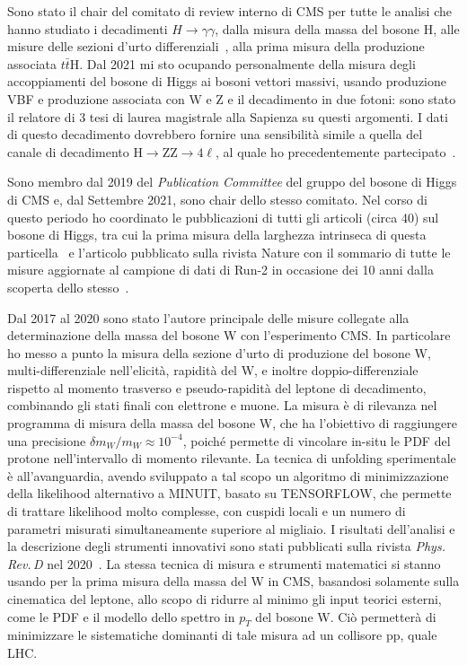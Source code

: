 \documentclass[a4paper,12pt,twoside]{article}
\begin{document}
{  Sono stato il chair del comitato di review interno di CMS per tutte
  le analisi che hanno studiato i decadimenti $H\to\gamma\gamma$,
  dalla misura della massa del bosone H, alle misure delle sezioni
  d'urto differenziali~, alla prima misura
  della produzione associata $t\bar{t}$H.  Dal 2021 mi sto ocupando
  personalmente della misura degli accoppiamenti del bosone di Higgs
  ai bosoni vettori massivi, usando produzione VBF e produzione
  associata con W e Z e il decadimento in due fotoni: sono stato il
  relatore di 3 tesi di laurea magistrale alla Sapienza su questi
  argomenti. I dati di questo decadimento dovrebbero fornire una
  sensibilit\`a simile a quella del canale di decadimento H$\to$ZZ$\to
  4\ell$, al quale ho precedentemente
  partecipato~.
  
  Sono membro dal 2019 del {\it Publication Committee} del gruppo del
  bosone di Higgs di CMS e, dal Settembre 2021, sono chair dello
  stesso comitato. Nel corso di questo periodo ho coordinato le
  pubblicazioni di tutti gli articoli (circa 40) sul bosone di Higgs,
  tra cui la prima misura della larghezza intrinseca di questa
  particella~ e l'articolo pubblicato sulla
  rivista Nature con il sommario di tutte le misure aggiornate al
  campione di dati di Run-2 in occasione dei 10 anni dalla scoperta
  dello stesso~.

  Dal 2017 al 2020 sono stato l'autore principale delle misure
  collegate alla determinazione della massa del bosone W con
  l'esperimento CMS. In particolare ho messo a punto la misura della
  sezione d'urto di produzione del bosone W, multi-differenziale
  nell'elicit\`a, rapidit\`a del W, e inoltre doppio-differenziale
  rispetto al momento trasverso e pseudo-rapidit\`a del leptone di
  decadimento, combinando gli stati finali con elettrone e muone. La
  misura \`e di rilevanza nel programma di misura della massa del
  bosone W, che ha l'obiettivo di raggiungere una precisione $\delta  m_W/m_W\approx 10^{-4}$,
  poich\'e permette di vincolare in-situ le
  PDF del protone nell'intervallo di momento rilevante. La tecnica di
  unfolding sperimentale \`e all'avanguardia, avendo sviluppato a tal
  scopo un algoritmo di minimizzazione della likelihood alternativo a
  \textsc{MINUIT}, basato su \textsc{TENSORFLOW}, che permette di
  trattare likelihood molto complesse, con cuspidi locali e un numero
  di parametri misurati simultaneamente superiore al migliaio. I
  risultati dell'analisi e la descrizione degli strumenti innovativi
  sono stati pubblicati sulla rivista \textit{Phys.\,Rev.\,D} nel
  2020~. La stessa tecnica di misura e strumenti
  matematici si stanno usando per la prima misura della massa del W in
  CMS, basandosi solamente sulla cinematica del leptone, allo scopo di
  ridurre al minimo gli input teorici esterni, come le PDF e il
  modello dello spettro in $p_T$ del bosone W.  Ci\`o permetter\`a di
  minimizzare le sistematiche dominanti di tale misura ad un collisore
  pp, quale LHC.

}
\end{document}
